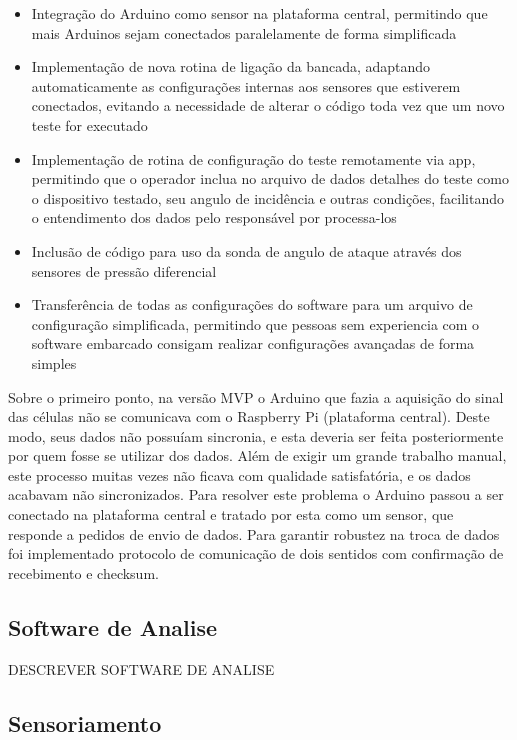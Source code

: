 \begin{itemize}
    \item Integração do Arduino como sensor na plataforma central, permitindo que mais Arduinos sejam conectados paralelamente de forma simplificada
    \item Implementação de nova rotina de ligação da bancada, adaptando automaticamente as configurações internas aos sensores que estiverem conectados, evitando a necessidade de alterar o código toda vez que um novo teste for executado
    \item Implementação de rotina de configuração do teste remotamente via app, permitindo que o operador inclua no arquivo de dados detalhes do teste como o dispositivo testado, seu angulo de incidência e outras condições, facilitando o entendimento dos dados pelo responsável por processa-los 
    \item Inclusão de código para uso da sonda de angulo de ataque através dos sensores de pressão diferencial
    \item Transferência de todas as configurações do software para um arquivo de configuração simplificada, permitindo que pessoas sem experiencia com o software embarcado consigam realizar configurações avançadas de forma simples
\end{itemize}

Sobre o primeiro ponto, na versão MVP o Arduino que fazia a aquisição do sinal das células não se comunicava com o Raspberry Pi (plataforma central). Deste modo, seus dados não possuíam sincronia, e esta deveria ser feita posteriormente por quem fosse se utilizar dos dados. Além de exigir um grande trabalho manual, este processo muitas vezes não ficava com qualidade satisfatória, e os dados acabavam não sincronizados. Para resolver este problema o Arduino passou a ser conectado na plataforma central e tratado por esta como um sensor, que responde a pedidos de envio de dados. Para garantir robustez na troca de dados foi implementado protocolo de comunicação de dois sentidos com confirmação de recebimento e checksum.  

\subsection{Software de Analise}

DESCREVER SOFTWARE DE ANALISE

\subsection{Sensoriamento}

